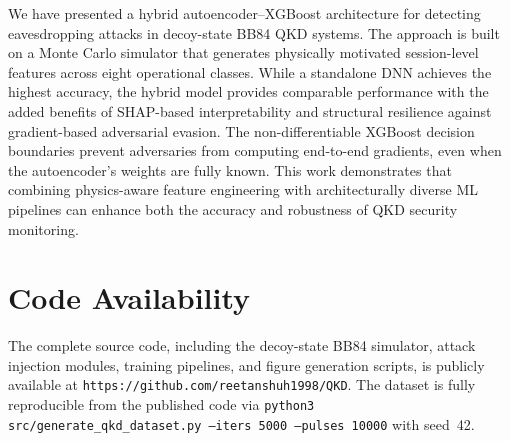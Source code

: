 \documentclass[conference]{IEEEtran}
\begin{document}
We have presented a hybrid autoencoder--XGBoost architecture for detecting eavesdropping attacks in decoy-state BB84 QKD systems. The approach is built on a Monte Carlo simulator that generates physically motivated session-level features across eight operational classes. While a standalone DNN achieves the highest accuracy, the hybrid model provides comparable performance with the added benefits of SHAP-based interpretability and structural resilience against gradient-based adversarial evasion. The non-differentiable XGBoost decision boundaries prevent adversaries from computing end-to-end gradients, even when the autoencoder's weights are fully known. This work demonstrates that combining physics-aware feature engineering with architecturally diverse ML pipelines can enhance both the accuracy and robustness of QKD security monitoring.

\section*{Code Availability}

The complete source code, including the decoy-state BB84 simulator, attack injection modules, training pipelines, and figure generation scripts, is publicly available at \texttt{https://github.com/reetanshuh1998/QKD}. The dataset is fully reproducible from the published code via \texttt{python3 src/generate\_qkd\_dataset.py --iters 5000 --pulses 10000} with seed~42.
\end{document}
